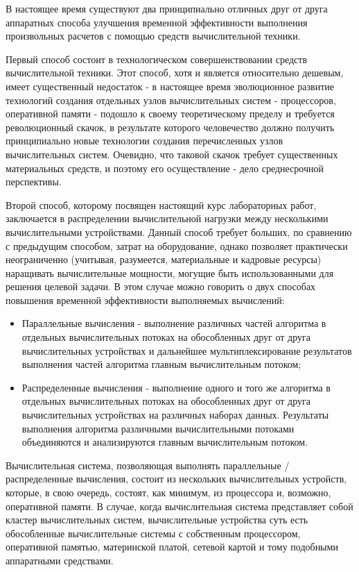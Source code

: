 

В настоящее время существуют два принципиально отличных друг от друга аппаратных способа улучшения временной эффективности выполнения произвольных расчетов с помощью средств вычислительной техники.

Первый способ состоит в технологическом совершенствовании средств вычислительной техники. Этот способ, хотя и является относительно дешевым, имеет существенный недостаток - в настоящее время эволюционное развитие технологий создания отдельных узлов вычислительных систем - процессоров, оперативной памяти - подошло к своему теоретическому пределу и требуется революционный скачок, в результате которого человечество должно получить принципиально новые технологии создания перечисленных узлов вычислительных систем. Очевидно, что таковой скачок требует существенных материальных средств, и поэтому его осуществление - дело среднесрочной перспективы.

Второй способ, которому посвящен настоящий курс лабораторных работ, заключается в распределении вычислительной нагрузки между несколькими вычислительными устройствами. Данный способ требует больших, по сравнению с предыдущим способом, затрат на оборудование, однако позволяет практически неограниченно (учитывая, разумеется, материальные и кадровые ресурсы) наращивать вычислительные мощности, могущие быть использованными для решения целевой задачи. В этом случае можно говорить о двух способах повышения временной эффективности выполняемых вычислений: %

\begin{itemize}

	\item Параллельные вычисления - выполнение различных частей алгоритма в отдельных вычислительных потоках на обособленных друг от друга вычислительных устройствах и дальнейшее мультиплексирование результатов выполнения частей алгоритма главным вычислительным потоком;

	\item Распределенные вычисления - выполнение одного и того же алгоритма в отдельных вычислительных потоках на обособленных друг от друга вычислительных устройствах на различных наборах данных. Результаты выполнения алгоритма различными вычислительными потоками объединяются и анализируются главным вычислительным потоком.

\end{itemize}

Вычислительная система, позволяющая выполнять параллельные / распределенные вычисления, состоит из нескольких вычислительных устройств, которые, в свою очередь, состоят, как минимум, из процессора и, возможно, оперативной памяти. В случае, когда вычислительная система представляет собой кластер вычислительных систем, вычислительные устройства суть есть обособленные вычислительные системы с собственным процессором, оперативной памятью, материнской платой, сетевой картой и тому подобными аппаратными средствами.

